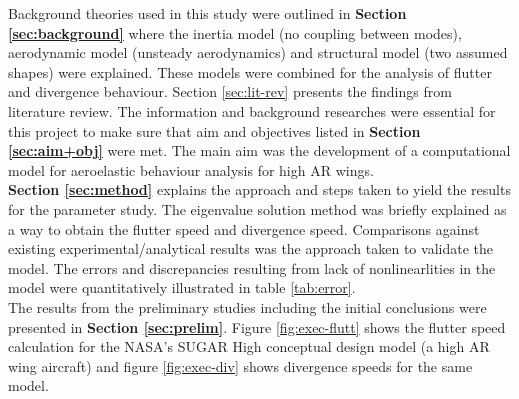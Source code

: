 \documentclass[11pt]{article}
\begin{document}
Background theories used in this study were outlined in \textbf{Section \ref{sec:background}} where the inertia model (no coupling between modes), aerodynamic model (unsteady aerodynamics) and structural model (two assumed shapes) were explained. These models were combined for the analysis of flutter and divergence behaviour. Section \ref{sec:lit-rev} presents the findings from literature review. The information and background researches were essential for this project to make sure that aim and objectives listed in \textbf{Section \ref{sec:aim+obj}} were met. The main aim was the development of a computational model for aeroelastic behaviour analysis for high AR wings. \\

\textbf{Section \ref{sec:method}} explains the approach and steps taken to yield the results for the parameter study. The eigenvalue solution method was briefly explained as a way to obtain the flutter speed and divergence speed. Comparisons against existing experimental/analytical results was the approach taken to validate the model. The errors and discrepancies resulting from lack of nonlinearlities in the model were quantitatively illustrated in table \ref{tab:error}.\\

The results from the preliminary studies including the initial conclusions were presented in \textbf{Section \ref{sec:prelim}}. Figure \ref{fig:exec-flutt} shows the flutter speed calculation for the NASA's SUGAR High conceptual design model (a high AR wing aircraft) and figure \ref{fig:exec-div} shows divergence speeds for the same model. 
\end{document}

